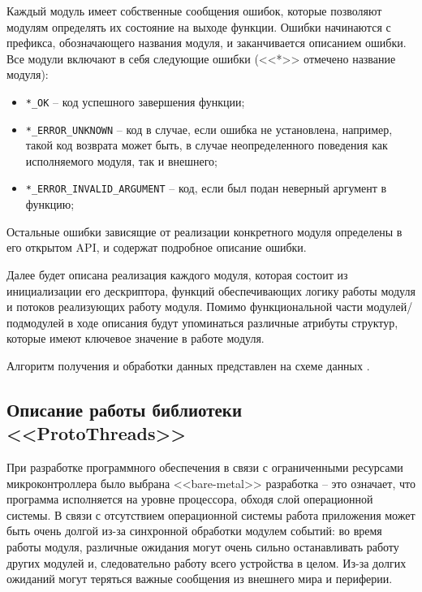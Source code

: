 Каждый модуль имеет собственные сообщения ошибок, которые позволяют модулям определять их состояние на выходе функции.
Ошибки начинаются с префикса, обозначающего названия модуля, и заканчивается описанием ошибки. Все модули включают в себя следующие
ошибки (<<*>> отмечено название модуля):

\begin{itemize}
    \item \lstinline{*_OK} -- код успешного завершения функции;
    \item \lstinline{*_ERROR_UNKNOWN} -- код в случае, если ошибка не установлена, например, 
    такой код возврата может быть, в случае неопределенного поведения как исполняемого модуля, так и внешнего;
    \item \lstinline{*_ERROR_INVALID_ARGUMENT} -- код, если был подан неверный аргумент в функцию;
\end{itemize}

Остальные ошибки зависящие от реализации конкретного модуля определены в его открытом API, и содержат подробное описание ошибки.

Далее будет описана реализация каждого модуля, которая состоит из инициализации его дескриптора, функций обеспечивающих логику работы модуля
и потоков реализующих работу модуля. Помимо функциональной части модулей/подмодулей в ходе описания будут упоминаться различные атрибуты структур,
которые имеют ключевое значение в работе модуля.

Алгоритм получения и обработки данных представлен на схеме
данных \dataScheme. 

\subsection{Описание работы библиотеки <<ProtoThreads>>}
При разработке программного обеспечения в связи с ограниченными ресурсами микроконтроллера было выбрана <<bare-metal>>
разработка -- это означает, что программа исполняется на уровне процессора, обходя слой операционной системы.
В связи с отсутствием операционной системы работа приложения может быть очень долгой из-за синхронной обработки модулем событий:
во время работы модуля, различные ожидания могут очень сильно останавливать работу других модулей и, следовательно работу всего устройства в целом.
Из-за долгих ожиданий могут теряться важные сообщения из внешнего мира и периферии.


